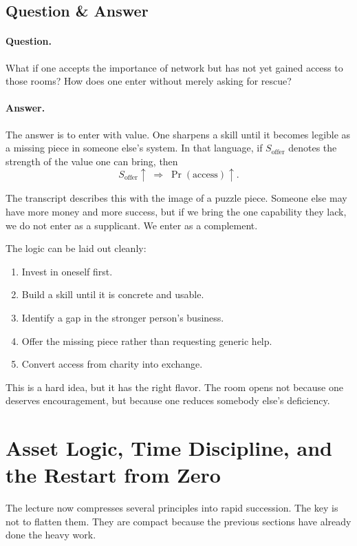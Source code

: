\subsection{Question \& Answer}

\paragraph{Question.}
What if one accepts the importance of network but has not yet gained access to those rooms? How does one enter without merely asking for rescue?

\paragraph{Answer.}
The answer is to enter with value. One sharpens a skill until it becomes legible as a missing piece in someone else's system. In that language, if \(S_{\text{offer}}\) denotes the strength of the value one can bring, then
\begin{equation}
S_{\text{offer}} \uparrow \;\Rightarrow\; \Pr(\text{access}) \uparrow.
\end{equation}

The transcript describes this with the image of a puzzle piece. Someone else may have more money and more success, but if we bring the one capability they lack, we do not enter as a supplicant. We enter as a complement.

The logic can be laid out cleanly:
\begin{enumerate}
\item Invest in oneself first.
\item Build a skill until it is concrete and usable.
\item Identify a gap in the stronger person's business.
\item Offer the missing piece rather than requesting generic help.
\item Convert access from charity into exchange.
\end{enumerate}

This is a hard idea, but it has the right flavor. The room opens not because one deserves encouragement, but because one reduces somebody else's deficiency.

\section{Asset Logic, Time Discipline, and the Restart from Zero}

The lecture now compresses several principles into rapid succession. The key is not to flatten them. They are compact because the previous sections have already done the heavy work.


